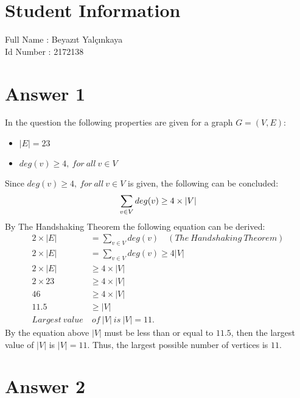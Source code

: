 \documentclass[11pt]{article}
\begin{document}
	
\section*{Student Information } 
Full Name : Beyazıt Yalçınkaya \\
Id Number : 2172138 \\

\section*{Answer 1}

In the question the following properties are given for a graph $G = (V, E)$:
\begin{itemize}
    \item $|E| = 23$
    \item $deg(v) \geq 4, \ for \ all \ v \in V$
\end{itemize}
Since $deg(v) \geq 4, \ for \ all \ v \in V$ is given, the following can be concluded:
\begin{equation*}
    \sum_{v \in V}{deg(v)} \geq 4 \times |V| \\
\end{equation*}
By The Handshaking Theorem the following equation can be derived:
\begin{equation*}
    \begin{split}
        2 \times |E| & = \sum_{v \in V}{deg(v)} \quad (The \ Handshaking \ Theorem) \\
        2 \times |E| & = \sum_{v \in V}{deg(v)} \geq 4 |V| \\
        2 \times |E| & \geq 4 \times |V| \\
        2 \times 23 & \geq 4 \times |V| \\
        46 & \geq 4 \times |V| \\
        11.5 & \geq |V| \\
        Largest \ value & \ of \ |V| \ is \ |V| = 11.
    \end{split}
\end{equation*}
By the equation above $|V|$ must be less than or equal to $11.5$, then the largest value of $|V|$ is $|V| =11$. Thus, the largest possible number of vertices is $11$.


\section*{Answer 2}
\end{document}
